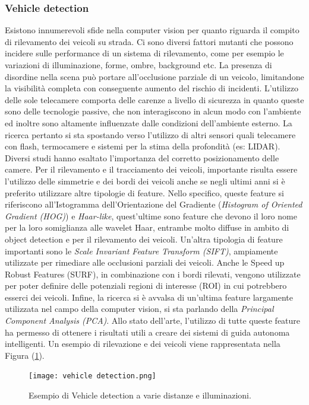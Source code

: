 \subsubsection{Vehicle detection}
Esistono innumerevoli sfide nella computer vision per quanto riguarda il 
compito di rilevamento dei veicoli su strada. Ci sono diversi fattori mutanti 
che possono incidere sulle performance di un sistema di rilevamento, come 
per esempio le variazioni di illuminazione, forme, ombre, background etc. 
La presenza di disordine nella scena può portare all'occlusione parziale di 
un veicolo, limitandone la visibilità completa con conseguente aumento del 
rischio di incidenti. L'utilizzo delle sole telecamere comporta delle carenze 
a livello di sicurezza in quanto queste sono delle tecnologie passive, che 
non interagiscono in alcun modo con l'ambiente ed inoltre sono altamente 
influenzate dalle condizioni dell'ambiente esterno. La ricerca pertanto si 
sta spostando verso l'utilizzo di altri sensori quali telecamere con flash, 
termocamere e sistemi per la stima della profondità (es: LIDAR). Diversi 
studi hanno esaltato l'importanza del corretto posizionamento delle camere. 
Per il rilevamento e il tracciamento dei veicoli, importante risulta essere 
l'utilizzo delle simmetrie e dei bordi dei veicoli anche se negli ultimi anni si 
è preferito utilizzare altre tipologie di feature. Nello specifico, queste feature 
si riferiscono all'Istogramma dell'Orientazione del Gradiente (\emph{Histogram 
of Oriented Gradient (HOG)}) e \emph{Haar-like}, quest'ultime sono feature che 
devono il loro nome per la loro somiglianza alle wavelet Haar, entrambe molto 
diffuse in ambito di object detection e per il rilevamento dei veicoli. Un'altra 
tipologia di feature importanti sono le \emph{Scale Invariant Feature Transform 
(SIFT)}, ampiamente utilizzate per rimediare alle occlusioni parziali dei 
veicoli. Anche le Speed up Robust Features (SURF), in combinazione con i 
bordi rilevati, vengono utilizzate per poter definire delle potenziali regioni 
di interesse (ROI) in cui potrebbero esserci dei veicoli. Infine, la ricerca si è 
avvalsa di un'ultima feature largamente utilizzata nel campo della computer 
vision, si sta parlando della \emph{Principal Component Analysis (PCA)}. Allo 
stato dell'arte, l'utilizzo di tutte queste feature ha permesso di ottenere i 
risultati utili a creare dei sistemi di guida autonoma intelligenti. Un esempio 
di rilevazione e dei veicoli viene rappresentata nella Figura (\ref{vehicle-det}).
\begin{figure}
    \centering
    \texttt{[image: vehicle detection.png]}
    \centering
    \caption{Esempio di Vehicle detection a varie distanze e illuminazioni.}
    \label{vehicle-det}
\end{figure}

